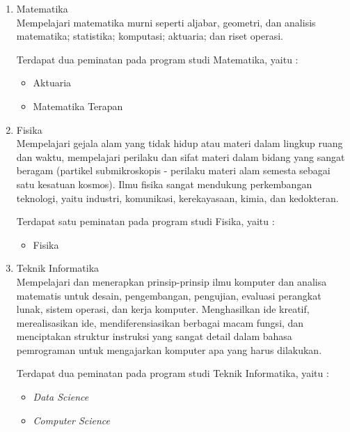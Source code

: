 	\begin{enumerate}
		\item Matematika\\
			Mempelajari matematika murni seperti aljabar, geometri, dan analisis matematika; statistika; komputasi; aktuaria; dan riset operasi.

			Terdapat dua peminatan pada program studi Matematika, yaitu :
			
			\begin{itemize}
				\item Aktuaria
				\item Matematika Terapan
			\end{itemize}\leavevmode
			
		\item Fisika\\
			 Mempelajari gejala alam yang tidak hidup atau materi dalam lingkup ruang dan waktu, mempelajari perilaku dan sifat materi dalam bidang yang sangat beragam (partikel submikroskopis - perilaku materi alam semesta sebagai satu kesatuan kosmos). Ilmu fisika sangat mendukung perkembangan teknologi, yaitu industri, komunikasi, kerekayasaan, kimia, dan kedokteran.
			 
			 Terdapat satu peminatan pada program studi Fisika, yaitu :
			
			\begin{itemize}
				\item Fisika
			\end{itemize}\leavevmode

		\item Teknik Informatika\\
			Mempelajari dan menerapkan prinsip-prinsip ilmu komputer dan analisa matematis untuk desain, pengembangan, pengujian, evaluasi perangkat lunak, sistem operasi, dan kerja komputer. Menghasilkan ide kreatif, merealisasikan ide, mendiferensiasikan berbagai macam fungsi, dan menciptakan struktur instruksi yang sangat detail dalam bahasa pemrograman untuk mengajarkan komputer apa yang harus dilakukan.
			
			Terdapat dua peminatan pada program studi Teknik Informatika, yaitu :
			
			\begin{itemize}
				\item \textit{Data Science}
				\item \textit{Computer Science}
			\end{itemize}\leavevmode
			
	\end{enumerate}\leavevmode
	
